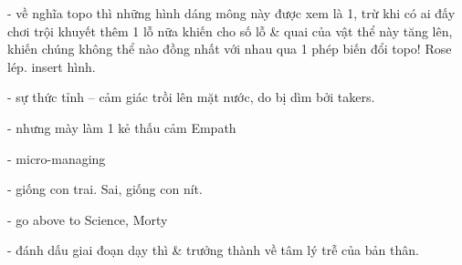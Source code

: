 \documentclass[12pt,twoside]{book}
\begin{document}
- về nghĩa topo thì những hình dáng mông này được xem là 1, trừ khi có ai đấy chơi trội khuyết thêm 1 lỗ nữa khiến cho số lỗ \& quai của vật thể này tăng lên, khiến chúng không thể nào đồng nhất với nhau qua 1 phép biến đổi topo! Rose lép. insert hình.

- sự thức tỉnh -- cảm giác trồi lên mặt nước, do bị dìm bởi takers.

- nhưng mày làm 1 kẻ thấu cảm Empath

- micro-managing

- giống con trai. Sai, giống con nít.

- go above to Science, Morty

- đánh dấu giai đoạn dạy thì \& trưởng thành về tâm lý trễ của bản thân.

\end{document}
